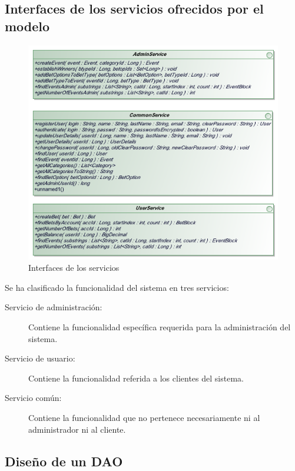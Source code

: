 \documentclass[a4paper,twoside]{article}
\begin{document}
\newpage
\subsection{Interfaces de los servicios ofrecidos por el modelo}

\begin{figure}[H]
  \centering
  \caption{Interfaces de los servicios}
  \includegraphics[scale=.7]{../uml/Diagramas_it2_imgs/Class_Diagram__Interfaces.png}
\end{figure}

Se ha clasificado la funcionalidad del sistema en tres servicios:

\begin{description}
\item[Servicio de administración:] Contiene la funcionalidad específica requerida para la administración del sistema.
\item[Servicio de usuario:] Contiene la funcionalidad referida a los clientes del sistema.
\item[Servicio común:] Contiene la funcionalidad que no pertenece necesariamente ni al administrador ni al cliente.
\end{description}



\newpage
\subsection{Diseño de un DAO}
\end{document}
